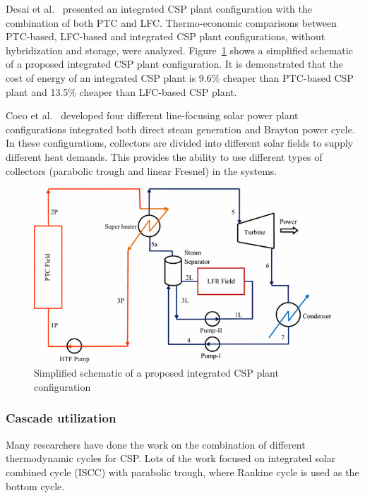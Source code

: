 Desai et al.~\cite{Desai2015} presented an integrated CSP plant configuration with the combination of both PTC and LFC. Thermo-economic comparisons between PTC-based, LFC-based and integrated CSP plant configurations, without hybridization and storage, were analyzed. Figure~\ref{fig:Desai2015} shows a simplified schematic of a proposed integrated CSP plant configuration. It is demonstrated that the cost of energy of an integrated CSP plant is 9.6\% cheaper than PTC-based CSP plant and 13.5\% cheaper than LFC-based CSP plant.

Coco et al.~\cite{Coco2015} developed four different line-focusing solar power plant configurations integrated both direct steam generation and Brayton power cycle. In these configurations, collectors are divided into different solar fields to supply different heat demands. This provides the ability to use different types of collectors (parabolic trough and linear Fresnel) in the systems.

\begin{figure}[!ht]
\centering
\includegraphics[width=.7\textwidth]{fig/Desai2015.jpg}
\caption{Simplified schematic of a proposed integrated CSP plant configuration}\label{fig:Desai2015}
\end{figure}


\subsubsection{Cascade utilization}

Many researchers have done the work on the combination of different thermodynamic cycles for CSP. 
Lots of the work focused on integrated solar combined cycle (ISCC) with parabolic trough, where Rankine cycle is used as the bottom cycle.


